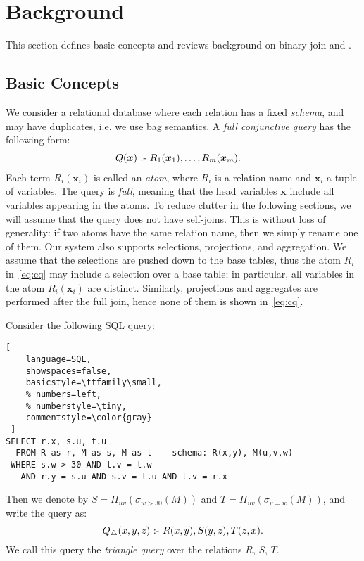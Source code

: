 \section{Background}\label{sec:background}

This section defines basic concepts and reviews background on binary
join and \GJ.

\subsection{Basic Concepts}\label{sec:basic-concepts}

We consider a relational database where each relation has a fixed
\emph{schema}, and may have duplicates, i.e. we use bag semantics.
A \emph{full conjunctive query} has the following form:
%
\begin{align}
  Q(\bm x) \text{ :- } & R_1(\bm x_1), \ldots, R_m(\bm x_m). \label{eq:cq}
\end{align}
%
Each term $R_i(\bm x_i)$ is called an \emph{atom}, where $R_i$ is a
relation name and $\bm x_i$ a tuple of variables.  The query is
\emph{full}, meaning that the head variables $\bm x$ include all
variables appearing in the atoms.  To reduce clutter in the following
sections, we will assume that the query does not have self-joins.
This is without loss of generality: if two atoms have the same
relation name, then we simply rename one of them.  Our system also
supports selections, projections, and aggregation.  We assume that the
selections are pushed down to the base tables, thus the atom $R_i$
in~\eqref{eq:cq} may include a selection over a base table; in
particular, all variables in the atom $R_i(\bm x_i)$ are distinct.
Similarly, projections and aggregates are performed after the full
join, hence none of them is shown in~\eqref{eq:cq}.


\begin{example} \label{ex:triangle} Consider the following SQL query:
\begin{lstlisting}[
    language=SQL,
    showspaces=false,
    basicstyle=\ttfamily\small,
    % numbers=left,
    % numberstyle=\tiny,
    commentstyle=\color{gray}
 ]
SELECT r.x, s.u, t.u
  FROM R as r, M as s, M as t -- schema: R(x,y), M(u,v,w)
 WHERE s.w > 30 AND t.v = t.w
   AND r.y = s.u AND s.v = t.u AND t.v = r.x
\end{lstlisting}
%
Then we denote by $S = \Pi_{uv}(\sigma_{w>30}(M))$ and $T =
\Pi_{uv}(\sigma_{v=w}(M))$, and write the query as:
$$Q_{\triangle}(x,y,z) \text{ :- } R(x, y), S(y,z), T(z, x).$$
%
We call this query the \emph{triangle query} over the relations $R$, $S$,
$T$.
\end{example}


